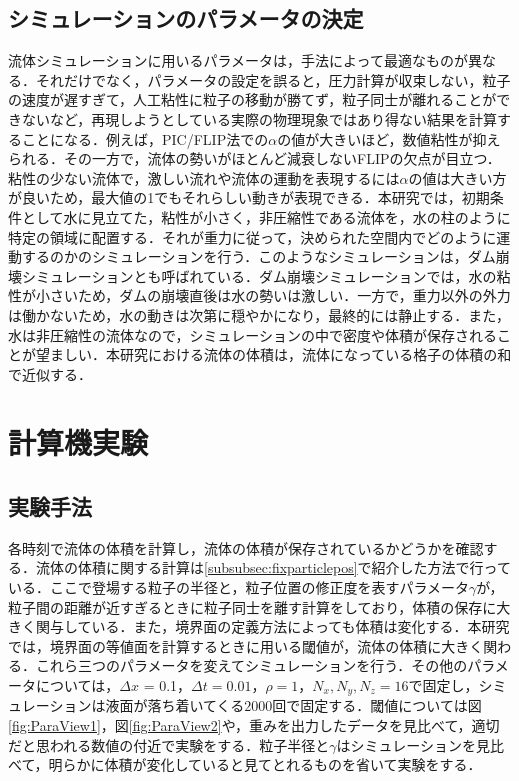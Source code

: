 \documentclass[a4j,12pt]{jreport}
\begin{document}
\section{シミュレーションのパラメータの決定} \label{sec:constant}
流体シミュレーションに用いるパラメータは，手法によって最適なものが異なる．それだけでなく，パラメータの設定を誤ると，圧力計算が収束しない，粒子の速度が遅すぎて，人工粘性に粒子の移動が勝てず，粒子同士が離れることができないなど，再現しようとしている実際の物理現象ではあり得ない結果を計算することになる．例えば，PIC/FLIP法での$\alpha$の値が大きいほど，数値粘性が抑えられる．その一方で，流体の勢いがほとんど減衰しないFLIPの欠点が目立つ．粘性の少ない流体で，激しい流れや流体の運動を表現するには$\alpha$の値は大きい方が良いため，最大値の1でもそれらしい動きが表現できる．本研究では，初期条件として水に見立てた，粘性が小さく，非圧縮性である流体を，水の柱のように特定の領域に配置する．それが重力に従って，決められた空間内でどのように運動するのかのシミュレーションを行う．このようなシミュレーションは，ダム崩壊シミュレーションとも呼ばれている．ダム崩壊シミュレーションでは，水の粘性が小さいため，ダムの崩壊直後は水の勢いは激しい．一方で，重力以外の外力は働かないため，水の動きは次第に穏やかになり，最終的には静止する．また，水は非圧縮性の流体なので，シミュレーションの中で密度や体積が保存されることが望ましい．本研究における流体の体積は，流体になっている格子の体積の和で近似する．

\chapter{計算機実験} \label{chapter:5}
\section{実験手法} \label{sec:exp_method}
各時刻で流体の体積を計算し，流体の体積が保存されているかどうかを確認する．流体の体積に関する計算は\ref{subsubsec:fixparticlepos}で紹介した方法で行っている．ここで登場する粒子の半径と，粒子位置の修正度を表すパラメータ$\gamma$が，粒子間の距離が近すぎるときに粒子同士を離す計算をしており，体積の保存に大きく関与している．また，境界面の定義方法によっても体積は変化する．本研究では，境界面の等値面を計算するときに用いる閾値が，流体の体積に大きく関わる．これら三つのパラメータを変えてシミュレーションを行う．その他のパラメータについては，$\varDelta x$ = 0.1，$\varDelta t = 0.01$，$\rho = 1$，$N_x,N_y,N_z = 16$で固定し，シミュレーションは液面が落ち着いてくる$2000回$で固定する．閾値については図\ref{fig:ParaView1}，図\ref{fig:ParaView2}や，重みを出力したデータを見比べて，適切だと思われる数値の付近で実験をする．粒子半径と$\gamma$はシミュレーションを見比べて，明らかに体積が変化していると見てとれるものを省いて実験をする．
\end{document}
